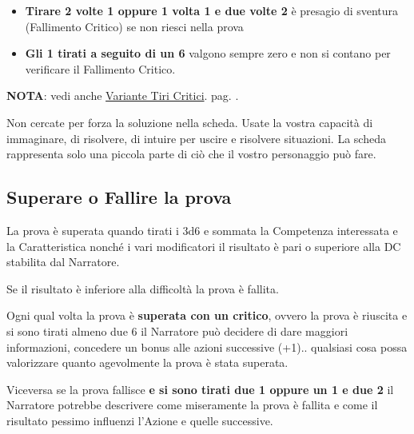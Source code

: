 \begin{multicols}{2}
\begin{itemize}[leftmargin=*]
\item\textbf{Tirare 2 volte 1 oppure 1 volta 1 e due volte 2} è presagio di sventura (Fallimento Critico) se non riesci nella prova 

\item\textbf{Gli 1 tirati a seguito di un 6} valgono sempre zero e non si contano per verificare il Fallimento Critico.

\end{itemize}


\textbf{NOTA}: vedi anche \hyperlink{variantetiricritici}{Variante Tiri Critici}. pag. \pageref{variantetiricritici}.

\begin{changemargin}{0.3cm}{0.3cm}\begin{tcolorbox}[title = Non c'è solo la scheda!]{
Non cercate per forza la soluzione nella scheda. Usate la vostra capacità di immaginare, di risolvere, di intuire per uscire e risolvere situazioni. La scheda rappresenta solo una piccola parte di ciò che il vostro personaggio può fare.
}\end{tcolorbox}\end{changemargin}

\subsection{Superare o Fallire la prova}\label{superareofallirelaprova}

La prova è superata quando tirati i 3d6 e sommata la Competenza interessata e la Caratteristica nonché i vari modificatori il risultato è pari o superiore alla DC stabilita dal Narratore.

Se il risultato è inferiore alla difficoltà la prova è fallita.

Ogni qual volta la prova è \textbf{superata con un critico}, ovvero la prova è riuscita e si sono tirati almeno due 6 il Narratore può decidere di dare maggiori informazioni, concedere un bonus alle azioni successive (+1).. qualsiasi cosa possa valorizzare quanto agevolmente la prova è stata superata.

Viceversa se la prova fallisce \textbf{e si sono tirati due 1 oppure un 1 e due 2} il Narratore potrebbe descrivere come miseramente la prova è fallita e come il risultato pessimo influenzi l'Azione e quelle successive.


\end{multicols}
